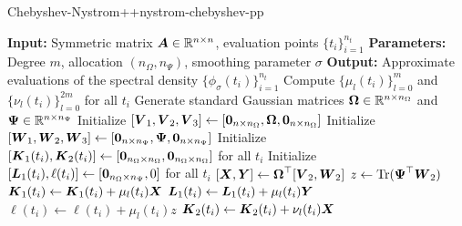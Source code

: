\documentclass[12pt]{article}
\begin{document}
\begin{algo}{Chebyshev-Nystrom++}{nystrom-chebyshev-pp}
\begin{algorithmic}[1]
    \Statex \textbf{Input:} Symmetric matrix $\boldsymbol{A} \in \mathbb{R}^{n \times n}$, evaluation points $\{t_i\}_{i=1}^{n_t}$
    \Statex \textbf{Parameters:} Degree $m$, allocation $(n_{\Omega}, n_{\Psi})$,  smoothing parameter $\sigma$
    \Statex \textbf{Output:} Approximate evaluations of the spectral density $\{\phi_{\sigma}(t_i)\}_{i=1}^{n_t}$
    \State Compute $\{\mu_l(t_i)\}_{l=0}^{m}$ and $\{\nu_l(t_i)\}_{l=0}^{2m}$ for all $t_i$ %
    \State Generate standard Gaussian matrices $\boldsymbol{\Omega} \in \mathbb{R}^{n \times n_{\Omega}}$ and $\boldsymbol{\Psi} \in \mathbb{R}^{n \times n_{\Psi}}$%
    \State Initialize $[\boldsymbol{V}_1, \boldsymbol{V}_2, \boldsymbol{V}_3] \gets [\boldsymbol{0}_{n \times n_{\Omega}}, \boldsymbol{\boldsymbol{\Omega}}, \boldsymbol{0}_{n \times n_{\Omega}}]$
    \State Initialize $[\boldsymbol{W}_1, \boldsymbol{W}_2, \boldsymbol{W}_3] \gets [\boldsymbol{0}_{n \times n_{\Psi}}, \boldsymbol{\Psi}, \boldsymbol{0}_{n \times n_{\Psi}}]$
    \State Initialize $[\boldsymbol{K}_1(t_i), \boldsymbol{K}_2(t_i)] \gets [\boldsymbol{0}_{n_{\Omega} \times n_{\Omega}}, \boldsymbol{0}_{n_{\Omega} \times n_{\Omega}}]$ for all $t_i$
    \State Initialize $[\boldsymbol{L}_1(t_i), \ell(t_i)] \gets [\boldsymbol{0}_{n_{\Omega} \times n_{\Psi}}, 0]$ for all $t_i$
    \State $[\boldsymbol{X}, \boldsymbol{Y}] \gets \boldsymbol{\boldsymbol{\Omega}}^{\top} [\boldsymbol{V}_2, \boldsymbol{W}_2]$  
      \State $z \gets \operatorname{Tr}(\boldsymbol{\Psi}^{\top} \boldsymbol{W}_2)$
            \State $\boldsymbol{K}_1(t_i) \gets \boldsymbol{K}_1(t_i) + \mu_l(t_i) \boldsymbol{X}$ 
            \State $\boldsymbol{L}_1(t_i) \gets \boldsymbol{L}_1(t_i) + \mu_l(t_i) \boldsymbol{Y}$ 
            \State $\ell(t_i) \gets \ell(t_i) + \mu_l(t_i) z$ 
        \EndIf
        \State $\boldsymbol{K}_2(t_i) \gets \boldsymbol{K}_2(t_i) + \nu_l(t_i) \boldsymbol{X}$ 

\end{algorithmic}
\end{algo}
\end{document}

